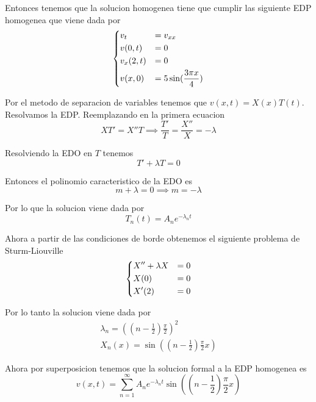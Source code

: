 \documentclass[../main.tex]{subfiles}
\begin{document}
\begin{solution}
  Entonces tenemos que la solucion homogenea tiene que cumplir las siguiente EDP homogenea que viene dada por
  \begin{equation*}
    \begin{dcases}
      v_{t} &= v_{xx}\\
      v(0, t) &= 0\\
      v_{x}(2, t) &= 0\\
      v(x, 0) &= 5 \sin(\frac{3\pi x}{4})
    \end{dcases}
  \end{equation*}

  Por el metodo de separacion de variables tenemos que $v(x, t) = X(x)T(t)$. Resolvamos la EDP.
  Reemplazando en la primera ecuacion
  \begin{equation*}
    XT' = X''T \implies \frac{T'}{T} = \frac{X''}{X} = -\lambda
  \end{equation*}

  Resolviendo la EDO en $T$ tenemos
  \begin{equation*}
    T' + \lambda T = 0
  \end{equation*}

  Entonces el polinomio caracteristico de la EDO es
  \begin{equation*}
    m + \lambda = 0 \implies m = - \lambda
  \end{equation*}

  Por lo que la solucion viene dada por
  \begin{equation*}
    T_{n}(t) = A_{n}e^{-\lambda_{n} t}
  \end{equation*}

  Ahora a partir de las condiciones de borde obtenemos el siguiente problema de Sturm-Liouville
  \begin{equation*}
    \begin{dcases}
     X'' + \lambda X &= 0\\
     X(0) &= 0\\
     X'(2) &= 0
    \end{dcases}
  \end{equation*}

  Por lo tanto la solucion viene dada por
  \begin{gather*}
    \lambda_{n} = ((n - \frac{1}{2}) \frac{\pi}{2})^{2}\\
    X_{n}(x) = \sin((n - \frac12) \frac{\pi}{2} x)
  \end{gather*}

  Ahora por superposicion tenemos que la solucion formal a la EDP homogenea es
  \begin{equation*}
    v(x, t) = \sum_{n = 1}^{\infty} A_{n}e^{-\lambda_{n} t}\sin((n - \frac12) \frac{\pi}{2}x)
  \end{equation*}


\end{solution}
\end{document}
